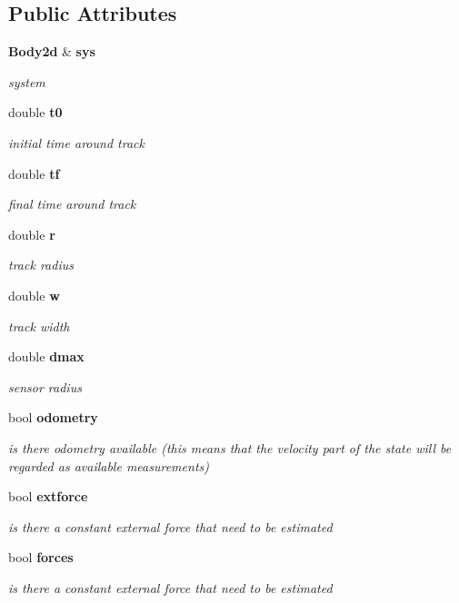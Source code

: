 \subsection*{\-Public \-Attributes}
\begin{DoxyCompactItemize}
\item 
{\bf \-Body2d} \& {\bf sys}
\begin{DoxyCompactList}\small\item\em system \end{DoxyCompactList}\item 
double {\bf t0}
\begin{DoxyCompactList}\small\item\em initial time around track \end{DoxyCompactList}\item 
double {\bf tf}
\begin{DoxyCompactList}\small\item\em final time around track \end{DoxyCompactList}\item 
double {\bf r}
\begin{DoxyCompactList}\small\item\em track radius \end{DoxyCompactList}\item 
double {\bf w}
\begin{DoxyCompactList}\small\item\em track width \end{DoxyCompactList}\item 
double {\bf dmax}
\begin{DoxyCompactList}\small\item\em sensor radius \end{DoxyCompactList}\item 
bool {\bf odometry}
\begin{DoxyCompactList}\small\item\em is there odometry available (this means that the velocity part of the state will be regarded as available measurements) \end{DoxyCompactList}\item 
bool {\bf extforce}
\begin{DoxyCompactList}\small\item\em is there a constant external force that need to be estimated \end{DoxyCompactList}\item 
bool {\bf forces}
\begin{DoxyCompactList}\small\item\em is there a constant external force that need to be estimated \end{DoxyCompactList}\item 

\end{DoxyCompactItemize}
